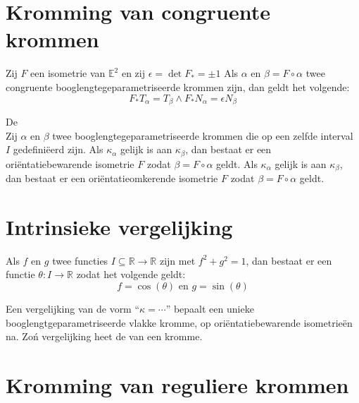 \documentclass[main.tex]{subfiles}
\begin{document}
\section{Kromming van congruente krommen}
\label{sec:kromm-van-congr}

\begin{st}
  Zij $F$ een isometrie van $\mathbb{E}^{2}$ en zij $\epsilon = \det F_{*} = \pm 1$
  Als $\alpha$ en $\beta = F \circ \alpha$ twee congruente booglengtegeparametriseerde krommen zijn, dan geldt het volgende:
  \[ F_{*}T_{\alpha} = T_{\beta} \wedge F_{*}N_{\alpha} = \epsilon N_{\beta} \]
\end{st}

\begin{st}
  \examen
  De \\
  Zij $\alpha$ en $\beta$ twee booglengtegeparametriseerde krommen die op een zelfde interval $I$ gedefini\"eerd zijn.
  Als $\kappa_{\alpha}$ gelijk is aan $\kappa_{\beta}$, dan bestaat er een ori\"entatiebewarende isometrie $F$ zodat $\beta = F \circ \alpha$ geldt.
  Als $\kappa_{\alpha}$ gelijk is aan $\kappa_{\beta}$, dan bestaat er een ori\"entatieomkerende isometrie $F$ zodat $\beta = F \circ \alpha$ geldt.
\end{st}

\section{Intrinsieke vergelijking}
\label{sec:intr-verg}

\begin{lem}
  Als $f$ en $g$ twee functies $I \subseteq \mathbb{R} \rightarrow \mathbb{R}$ zijn met $f^{2}+g^{2} = 1$, dan bestaat er een functie $\theta: I \rightarrow \mathbb{R}$ zodat het volgende geldt:
  \[ f = \cos(\theta) \text{ en } g = \sin(\theta) \]
\end{lem}

\begin{de}
  Een vergelijking van de vorm ``$\kappa = \dotsb$'' bepaalt een unieke booglengtgeparametriseerde vlakke kromme, op ori\"entatiebewarende isometrie\"en na.
  Zo\'n vergelijking heet de  van een kromme.
\end{de}

\section{Kromming van reguliere krommen}
\label{sec:kromm-van-regul}
\end{document}
